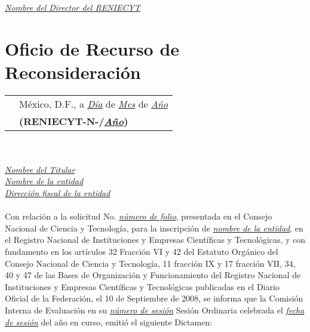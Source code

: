 \\ \\ \\

\noindent \underline{{\it Nombre del Director del RENIECYT}}\\


\newpage
\section{Oficio de Recurso de Reconsideración}
\label{appendix:Constancias:OficioRecursoDeReconsideracion}

\begin{tabular}{ m{} m{} }%
& México, D.F., a \underline{{\it Día}} de \underline{{\it Mes}} de \underline{{\it Año}} \\
& {\bf (RENIECYT-N-/\underline{{\it Año}})} \\
\end{tabular}\\ \\

\noindent \underline{{\it Nombre del Titular}}\\
\noindent \underline{{\it Nombre de la entidad}}\\
\noindent \underline{{\it Dirección fiscal de la entidad}}\\ \\


\noindent Con relación a la solicitud No. \underline{{\it número de folio}}, presentada en el Consejo Nacional de Ciencia y Tecnología, para la inscripción de \underline{{\it nombre de la entidad}}, en el Registro Nacional de Instituciones y Empresas Científicas y Tecnológicas, y con fundamento en los artículos 32 Fracción VI y 42 del Estatuto Orgánico del Consejo Nacional de Ciencia y Tecnología, 11 fracción IX y 17 fracción VII, 34, 40 y 47 de las Bases de Organización y Funcionamiento del Registro Nacional de Instituciones y Empresas Científicas y Tecnológicas publicadas en el Diario Oficial de la Federación, el 10 de Septiembre de 2008, se informa que la Comisión Interna de Evaluación en su \underline{{\it número de sesión}} Sesión Ordinaria celebrada el \underline{{\it fecha de sesión}} del año en curso, emitió el siguiente Dictamen:\\

